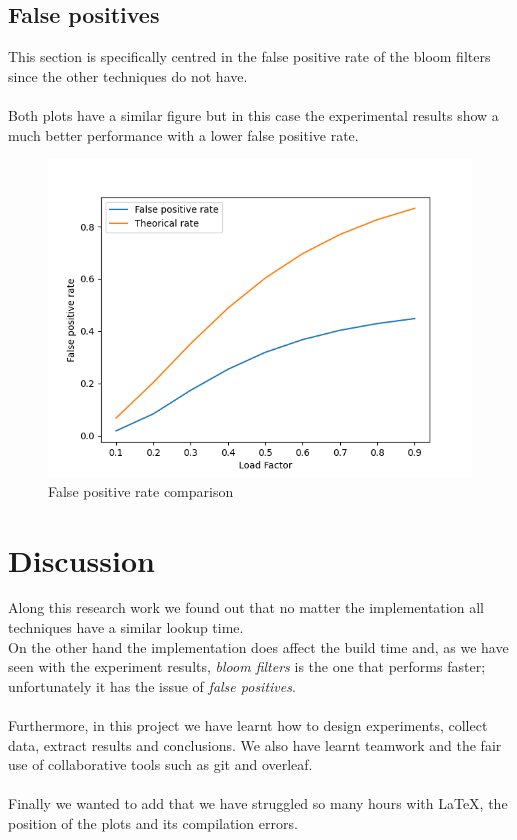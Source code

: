 \documentclass{article}
\begin{document}
    \subsection*{False positives}
        This section is specifically centred in the false positive rate of the bloom filters since the other techniques do not have. \\\\
        Both plots have a similar figure but in this case the experimental results show a much better performance with a lower false positive rate. 
        
        \begin{figure}[!h]
        \begin{center}
          \includegraphics[width=\linewidth]{images/loadFactor_vs_falsePositives.png}
          \caption{False positive rate comparison}\label{fig:plot16}
        \endminipage
        \end{center}
        \end{figure}

\section{Discussion}
Along this research work we found out that no matter the implementation all techniques have a similar lookup time. \\
On the other hand the implementation does affect the build time and, as we have seen with the experiment results, \textit{bloom filters} is the one that performs faster; unfortunately it has the issue of \textit{false positives}. \\\\
Furthermore, in this project we have learnt how to design experiments, collect data, extract results and conclusions. We also have learnt teamwork and the fair use of collaborative tools such as git and overleaf. \\\\
Finally we wanted to add that we have struggled so many hours with LaTeX, the position of the plots and its compilation errors.


    \printbibliography
\end{document}
